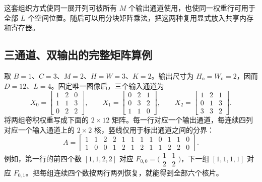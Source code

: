 这套组织方式使同一展开列可被所有 $M$ 个输出通道使用，也使同一权重行可用于全部 $L$ 个空间位置。随后可以用分块矩阵乘法，把这两种复用显式放入共享内存和寄存器。

\subsection{三通道、双输出的完整矩阵算例}
\label{l11:subsec:im2col_example}

取 $B=1$、$C=3$、$M=2$、$H=W=3$、$K=2$。输出尺寸为 $H_{\mathrm{o}}=W_{\mathrm{o}}=2$，因而 $D=12$、$L=4$。固定唯一图像后，三个输入通道为
\begin{equation}
  X_0=\begin{bmatrix}1&2&0\\1&1&3\\0&2&2\end{bmatrix},\qquad
  X_1=\begin{bmatrix}0&2&1\\0&3&2\\1&1&0\end{bmatrix},\qquad
  X_2=\begin{bmatrix}1&2&1\\0&1&3\\3&3&2\end{bmatrix}.
  \label{l11:eq:small_matrix_inputs}
\end{equation}
将两组卷积权重写成下面的 $2\times12$ 矩阵。每一行对应一个输出通道，每连续四列对应一个输入通道上的 $2\times2$ 核，竖线仅用于标出通道之间的分界：
\begin{equation}
  A=
  \left[\begin{array}{rrrr|rrrr|rrrr}
  1&1&2&2&1&1&1&1&0&1&1&0\\
  1&0&0&1&2&1&2&1&1&2&2&0
  \end{array}\right].
  \label{l11:eq:small_matrix_weights}
\end{equation}
例如，第一行的前四个数 $[1,1,2,2]$ 对应 $F_{0,0}=\bigl(\begin{smallmatrix}1&1\\2&2\end{smallmatrix}\bigr)$，下一组 $[1,1,1,1]$ 对应 $F_{0,1}$。把每组连续四个数按两行两列恢复，就能得到全部六个核片。

